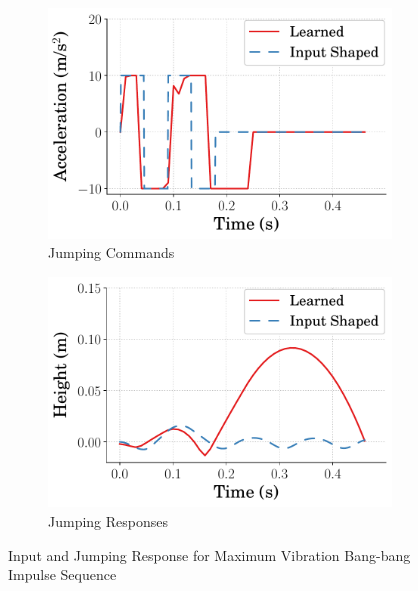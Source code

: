 \begin{figure}[tb!]
  \centering
      \begin{subfigure}{0.49\columnwidth}
      \centering
      \includegraphics[width=\columnwidth]{Figures/Ch3/input_shaping/learned_comparison_to_optimal_command.pdf}  
      \caption{Jumping Commands}
      \label{fig:optimum_jump_command}
      \end{subfigure}
      \hfill
      \begin{subfigure}{0.49\columnwidth}
      \centering
      \includegraphics[width=\columnwidth]{Figures/Ch3/input_shaping/learned_comparison_to_optimal_response.pdf}  
      \caption{Jumping Responses}
      \label{fig:optimum_jump_response}
      \end{subfigure}
  \caption{Input and Jumping Response for Maximum Vibration Bang-bang Impulse Sequence} %
  \label{fig:optimum_jump}	%
  \end{figure}
